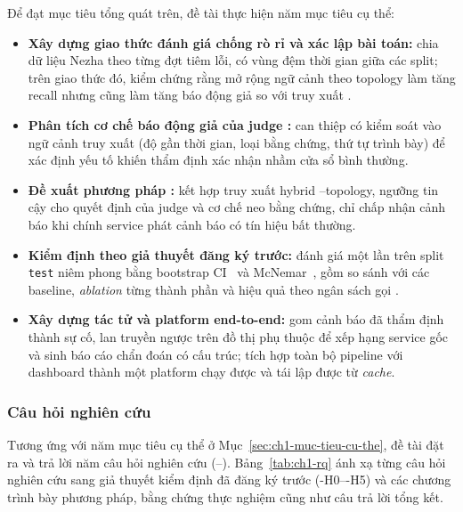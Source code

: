 Để đạt mục tiêu tổng quát trên, đề tài thực hiện năm mục tiêu cụ thể:
\begin{itemize}[label=--]
    \item \textbf{Xây dựng giao thức đánh giá chống rò rỉ và xác lập bài toán:}
    chia dữ liệu Nezha theo từng đợt tiêm lỗi, có vùng đệm thời gian giữa các split;
    trên giao thức đó, kiểm chứng rằng mở rộng ngữ cảnh theo topology làm tăng recall
    nhưng cũng làm tăng báo động giả so với truy xuất .

    \item \textbf{Phân tích cơ chế báo động giả của judge :}
    can thiệp có kiểm soát vào ngữ cảnh truy xuất (độ gần thời gian, loại bằng chứng,
    thứ tự trình bày) để xác định yếu tố khiến thẩm định xác nhận nhầm cửa sổ bình thường.

    \item \textbf{Đề xuất phương pháp \CTAV{}:}
    kết hợp truy xuất hybrid --topology, ngưỡng tin cậy cho quyết định của judge
    và cơ chế neo bằng chứng, chỉ chấp nhận cảnh báo khi chính service phát cảnh báo
    có tín hiệu bất thường.

    \item \textbf{Kiểm định theo giả thuyết đăng ký trước:}
    đánh giá một lần trên split \texttt{test} niêm phong bằng bootstrap CI~\cite{efron1993bootstrap} và McNemar~\cite{mcnemar1947note},
    gồm so sánh với các baseline, \textit{ablation} từng thành phần
    và hiệu quả theo ngân sách gọi .

    \item \textbf{Xây dựng tác tử  và platform end-to-end:}
    gom cảnh báo đã thẩm định thành sự cố, lan truyền ngược trên đồ thị phụ thuộc
    để xếp hạng service gốc và sinh báo cáo chẩn đoán có cấu trúc; tích hợp toàn bộ
    pipeline với dashboard thành một platform chạy được và tái lập được từ \textit{cache}.
\end{itemize}

\subsubsection{Câu hỏi nghiên cứu}
\label{sec:ch1-rq}

Tương ứng với năm mục tiêu cụ thể ở Mục~\ref{sec:ch1-muc-tieu-cu-the}, đề tài đặt ra và trả lời năm câu hỏi nghiên cứu (--). Bảng~\ref{tab:ch1-rq} ánh xạ từng câu hỏi nghiên cứu sang giả thuyết kiểm định đã đăng ký trước (\hyp{H0}--\hyp{H5}) và các chương trình bày phương pháp, bằng chứng thực nghiệm cũng như câu trả lời tổng kết.

